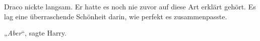 Draco nickte langsam. Er hatte es noch nie zuvor auf diese Art erklärt gehört. Es lag eine überraschende Schönheit darin, wie perfekt es zusammenpasste.

„\emph{Aber}“, sagte Harry.
